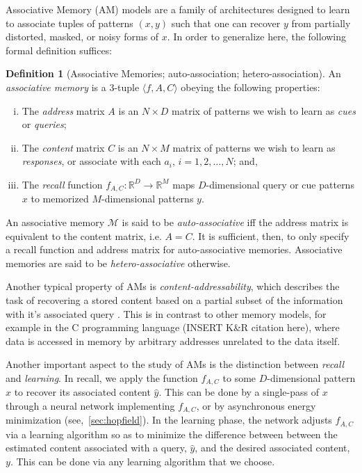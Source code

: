 \documentclass{article}
\theoremstyle{definition}
\newtheorem{definition}{Definition}[section]
\begin{document}
Associative Memory (AM) models are a family of architectures designed to
learn to associate tuples of patterns $(x, y)$ such that one can recover
$y$ from partially distorted, masked, or noisy forms of $x$. In order to 
generalize here, the following formal definition suffices:
\begin{definition}[Associative Memories; auto-association; hetero-association]\label{def:assoc-memory}
    An \textit{associative memory} is a $3$-tuple $\langle f, A, C \rangle$
    obeying the following properties:
    \begin{enumerate}[(i)]
        \item The \textit{address} matrix $A$ is an $N \times D$ matrix of 
        patterns we wish to learn as \textit{cues} or \textit{queries};\label{def:assoc:cond1}
        \item The \textit{content} matrix $C$ is an $N \times M$ matrix of
        patterns we wish to learn as \textit{responses}, or associate with 
        each $a_i$, $i = 1, 2, \dots, N$; and, \label{def:assoc:cond2}
        \item The \textit{recall} function 
        $f_{A, C} : \mathbb{R}^D \to \mathbb{R}^M$ maps $D$-dimensional query or 
        cue patterns $x$ to memorized $M$-dimensional patterns $y$. \label{def:assoc:cond3}
    \end{enumerate}
    An associative memory $\mathcal{M}$ is said to be \textit{auto-associative}
    iff the address matrix is equivalent to the content matrix, i.e. $A=C$. 
    It is sufficient, then, to only specify a recall function and address matrix for 
    auto-associative memories.  Associative memories are said to be \textit{hetero-associative} otherwise.
\end{definition}
Another typical property of AMs is \textit{content-addressability}, which 
describes the task of recovering a stored content based on a partial subset
of the information with it's associated query 
\parencites{mcclelland_appeal_1986,haykin_neural_2009}. This is in contrast
to other memory models, for example in the C programming language (INSERT K\&R citation here), where data
is accessed in memory by arbitrary addresses unrelated to the data itself.

Another important aspect to the study of AMs is the distinction between 
\textit{recall} and \textit{learning}. In recall, we apply the function 
$f_{A,C}$ to some $D$-dimensional pattern $x$ to recover its associated
content $\hat y$. This can be done by a single-pass of $x$ through
a neural network implementing $f_{A,C}$, or by asynchronous energy minimization
(see,~\autoref{sec:hopfield}). In the learning phase, the network adjusts
$f_{A,C}$ via a learning algorithm so as to minimize the difference between 
between the estimated content associated with a query, $\hat y$, and the desired
associated content, $y$. This can be done via any learning algorithm that we 
choose.
\end{document}
